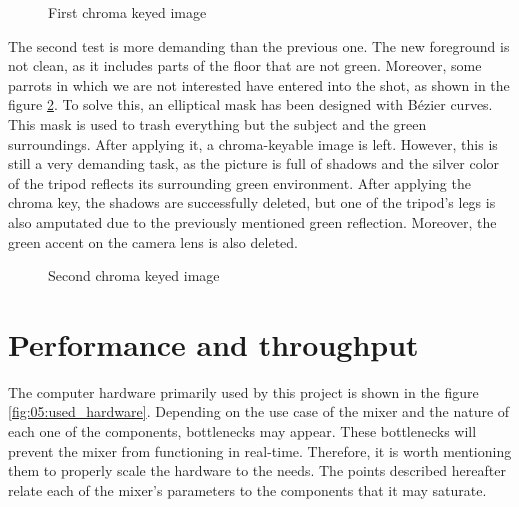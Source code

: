 \documentclass[../main.tex]{subfiles}
\begin{document}
\begin{figure}[htbp]
    \centering
    
    \caption{First chroma keyed image}
    \label{fig:05:keying1}
\end{figure}

The second test is more demanding than the previous one. The new foreground is not clean, as it includes parts of the floor that are not green. Moreover, some parrots in which we are not interested have entered into the shot, as shown in the figure \ref{fig:05:keying2}. To solve this, an elliptical mask has been designed with Bézier curves. This mask is used to trash everything but the subject and the green surroundings. After applying it, a chroma-keyable image is left. However, this is still a very demanding task, as the picture is full of shadows and the silver color of the tripod reflects its surrounding green environment. After applying the chroma key, the shadows are successfully deleted, but one of the tripod's legs is also amputated due to the previously mentioned green reflection. Moreover, the green accent on the camera lens is also deleted.\newline 

\begin{figure}[htbp]
    \centering
    
    \caption{Second chroma keyed image}
    \label{fig:05:keying2}
\end{figure}


\section{Performance and throughput}
The computer hardware primarily used by this project is shown in the figure \ref{fig:05:used_hardware}. Depending on the use case of the mixer and the nature of each one of the components, bottlenecks may appear. These bottlenecks will prevent the mixer from functioning in real-time. Therefore, it is worth mentioning them to properly scale the hardware to the needs. The points described hereafter relate each of the mixer's parameters to the components that it may saturate.
\end{document}
